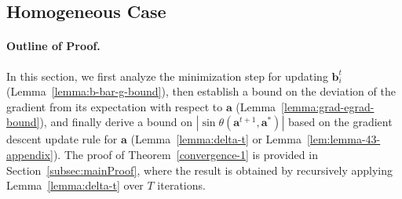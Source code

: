\documentclass{article}
\theoremstyle{plain}
\theoremstyle{definition}
\theoremstyle{remark}
\begin{document}
\subsection{Homogeneous Case} \label{sec:homo-analysis}
\paragraph{Outline of Proof.}
In this section, we first analyze the minimization step for updating ${\mathbf{b}_i^t}$ (Lemma~\ref{lemma:b-bar-g-bound}), then establish a bound on the deviation of the gradient from its expectation with respect to $\mathbf{a}$ (Lemma~\ref{lemma:grad-egrad-bound}), and finally derive a bound on $|\sin \theta (\mathbf{a}^{t+1}, \mathbf{a}^*)|$ based on the gradient descent update rule for $\mathbf{a}$ (Lemma~\ref{lemma:delta-t} or Lemma~\ref{lem:lemma-43-appendix}). The proof of Theorem~\ref{convergence-1} is provided in Section~\ref{subsec:mainProof}, where the result is obtained by recursively applying Lemma~\ref{lemma:delta-t} over $T$ iterations.
\end{document}
